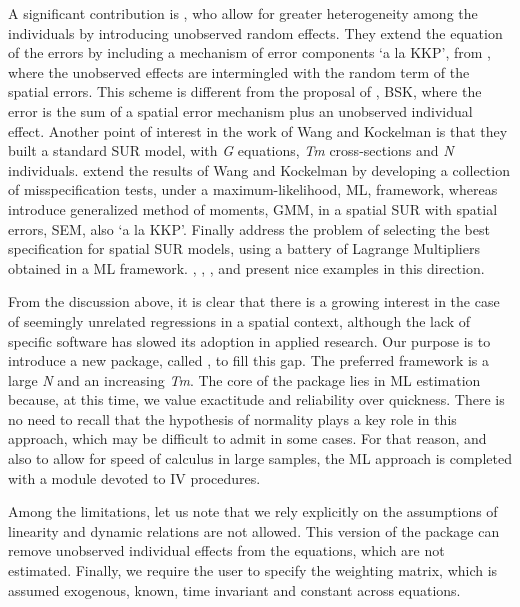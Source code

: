 \documentclass[article]{jss}
\begin{document}
A significant contribution is \citet{Wang2007}, who allow for greater heterogeneity among the individuals by introducing unobserved random effects. They extend the equation of the errors by including a mechanism of error components `a la KKP', from \citet{Kapoor2007}, where the unobserved effects are intermingled with the random term of the spatial errors. This scheme is different from the proposal of \citet{Baltagi2003}, BSK, where the error is the sum of a spatial error mechanism plus an unobserved individual effect. Another point of interest in the work of Wang and Kockelman is that they built a standard SUR model, with \emph{G} equations, \emph{Tm} cross-sections and \emph{N} individuals. \citet{Baltagibresson} extend the results of Wang and Kockelman by developing a collection of misspecification tests, under a maximum-likelihood, ML, framework, whereas \citet{Baltagipirotte} introduce generalized method of moments, GMM, in a spatial SUR with spatial errors, SEM, also `a la KKP'. Finally \citet{Lopez2014} address the problem of selecting the best specification for spatial SUR models, using a battery of Lagrange Multipliers obtained in a ML framework. \citet{Lundberg2006}, \citet{Zhou2009}, \citet{Cotteleer2012}, \citet{Izon2016} and \citet{Lopez2017} present nice examples in this direction.

From the discussion above, it is clear that there is a growing interest in the case of seemingly unrelated regressions in a spatial context, although the lack of specific software has slowed its adoption in applied research. Our purpose is to introduce a new  package, called , to fill this gap. The preferred framework is a large \emph{N} and an increasing \emph{Tm}. The core of the package lies in ML estimation because, at this time, we value exactitude and reliability over quickness. There is no need to recall that the hypothesis of normality plays a key role in this approach, which may be difficult to admit in some cases. For that reason, and also to allow for speed of calculus in large samples, the ML approach is completed with a module devoted to IV procedures.

Among the limitations, let us note that we rely explicitly on the assumptions of linearity and dynamic relations are not allowed. This version of the package can remove unobserved individual effects from the equations, which are not estimated. Finally, we require the user to specify the weighting matrix, which is assumed exogenous, known, time invariant and constant across equations.
\end{document}

